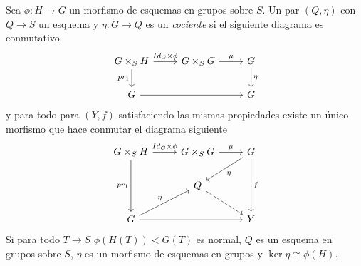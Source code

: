 \documentclass[GA.tex]{subfiles}
\begin{document}
\begin{defi}
Sea $\phi:H\to G$ un morfismo de esquemas en grupos sobre $S$. Un par $(Q,\eta)$ con $Q\to S$ un esquema y $\eta:G\to Q$ es un \emph{cociente} si el siguiente diagrama es conmutativo
\[
\begin{tikzcd}
G\times_S H \arrow[r, "Id_G\times\phi"] \arrow[d, "pr_1"'] & G\times_S G \arrow[r, "\mu"] & G \arrow[d, "\eta"] \\
G \arrow[rr] &  & G
\end{tikzcd}
\]
y para todo para $(Y,f)$ satisfaciendo las mismas propiedades existe un único morfismo que hace conmutar el diagrama siguiente
\[
\begin{tikzcd}
G\times_S H \arrow[r, "Id_G\times\phi"] \arrow[dd, "pr_1"'] & G\times_S G \arrow[r, "\mu"] & G \arrow[dd, "f"] \arrow[ld, "\eta"] \\
 & Q \arrow[rd, dashed] &  \\
G \arrow[ru, "\eta"] \arrow[rr] &  & Y
\end{tikzcd}
\]
Si para todo $T\to S$ $\phi(H(T))<G(T)$ es normal, $Q$ es un esquema en grupos sobre $S$, $\eta$ es un morfismo de esquemas en grupos y $\ker\eta\cong\phi(H)$. 
\end{defi}
\end{document}
